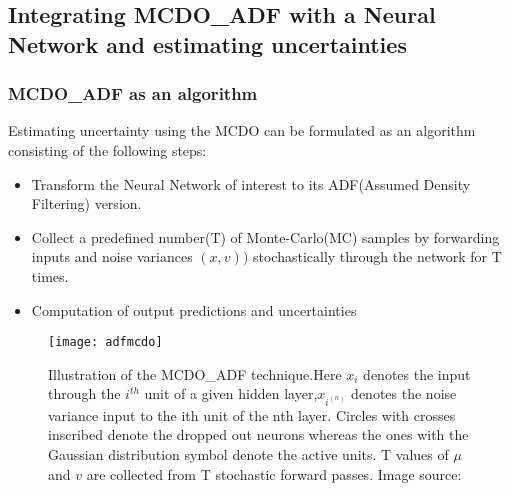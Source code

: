 	
	\subsection{Integrating MCDO\_ADF with a Neural Network and estimating uncertainties}
	\subsubsection{MCDO\_ADF as an algorithm}
	Estimating uncertainty using the MCDO can be formulated as an algorithm consisting of the following steps:
	\begin{itemize}
		\item Transform the Neural Network of interest to its ADF(Assumed Density Filtering) version.
		\item Collect a predefined number(T) of Monte-Carlo(MC) samples by forwarding inputs and noise variances $(x,v))$ stochastically through the network for T times.
		\item Computation of output predictions and uncertainties  
	\end{itemize}
	\begin{figure}[h]
		\texttt{[image: adfmcdo]}
		\caption{Illustration of the MCDO\_ADF technique.Here $x_{i}$ denotes the input through the $i^{th}$ unit of a given hidden layer,$x_{i^{(n)}}$ denotes the noise variance input to the ith unit of the nth layer. Circles with crosses inscribed denote the dropped out neurons whereas the ones with the Gaussian distribution symbol denote the active units. T values of $\mu$ and $v$ are collected from T stochastic forward passes. Image source: }
		\label{fig_adf_mcdo}
	\end{figure}
	
	
	
	
	
